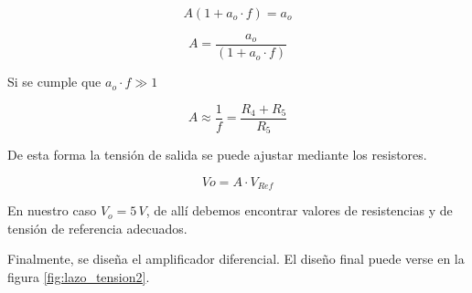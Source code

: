 \documentclass[]{article}
\begin{document}
\begin{equation}
	A(1+ a_o \cdot f ) = a_o 
\end{equation}


\begin{equation}
	A = \frac{a_o}{(1+ a_o \cdot f )} 
\end{equation}


Si se cumple que $a_o\cdot f \gg 1 $

\begin{equation}
	A \approx \frac{1}{f}  = \frac{ R_4 + R_5}{ R_5 }
\end{equation}


De esta forma la tensión de salida se puede ajustar mediante los resistores. 

\begin{equation}	
	Vo = A \cdot V_{Ref}
\end{equation}

En nuestro caso $V_o = 5\, V $, de allí debemos encontrar valores de resistencias y de tensión de referencia adecuados.


Finalmente, se diseña el amplificador diferencial. El diseño final puede verse en la figura \ref{fig:lazo_tension2}.
\end{document}
